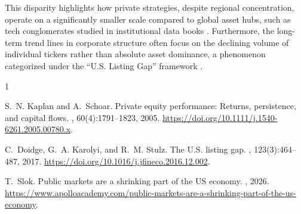 \documentclass[11pt,a4paper]{article}
\begin{document}
This disparity highlights how private strategies, despite regional concentration, operate on a significantly smaller scale compared to global asset hubs, such as tech conglomerates studied in institutional data books \cite{slok2026public}. Furthermore, the long-term trend lines in corporate structure often focus on the declining volume of individual tickers rather than absolute asset dominance, a phenomenon categorized under the ``U.S. Listing Gap'' framework \cite{doidge2017u}.

\begin{thebibliography}{1}

S.~N. Kaplan and A.~Schoar.
\newblock Private equity performance: Returns, persistence, and capital flows.
, 60(4):1791--1823, 2005.
\newblock \url{https://doi.org/10.1111/j.1540-6261.2005.00780.x}.

C.~Doidge, G.~A. Karolyi, and R.~M. Stulz.
\newblock The U.S. listing gap.
, 123(3):464--487, 2017.
\newblock \url{https://doi.org/10.1016/j.jfineco.2016.12.002}.

T.~Slok.
\newblock Public markets are a shrinking part of the US economy.
, 2026.
\newblock \url{https://www.apolloacademy.com/public-markets-are-a-shrinking-part-of-the-us-economy}.

\end{thebibliography}
\end{document}
